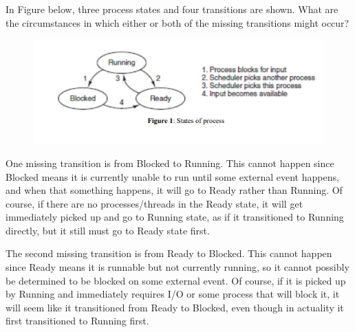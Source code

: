 \documentclass[12pt]{article}
\newenvironment{problem}[2][Problem]{\begin{trivlist}
\item[\hskip \labelsep {\bfseries #1}\hskip \labelsep {\bfseries #2.}]}{\end{trivlist}}
\begin{document}
\begin{problem}{2} %
    In Figure below, three process states and four transitions are shown. What are the
    circumstances in which either or both of the missing transitions might occur?
    \begin{figure}[ht]
        \centering
        \includegraphics[width=\textwidth]{problem2}
    \end{figure}

    One missing transition is from Blocked to Running. This cannot happen since Blocked means it is currently unable to run until some external event happens, and when that something happens, it will go to Ready rather than Running. 
    Of course, if there are no processes/threads in the Ready state, it will get immediately picked up and go to Running state, as if it transitioned to Running directly, but it still must go to Ready state first.

    The second missing transition is from Ready to Blocked. This cannot happen since Ready means it is runnable but not currently running, so it cannot possibly be determined to be blocked on some external event. Of course, if it is picked up by Running and immediately requires I/O or some process that will block it, it will seem like it transitioned from Ready to Blocked, even though in actuality it first transitioned to Running first.
\end{problem}
 
\end{document}
